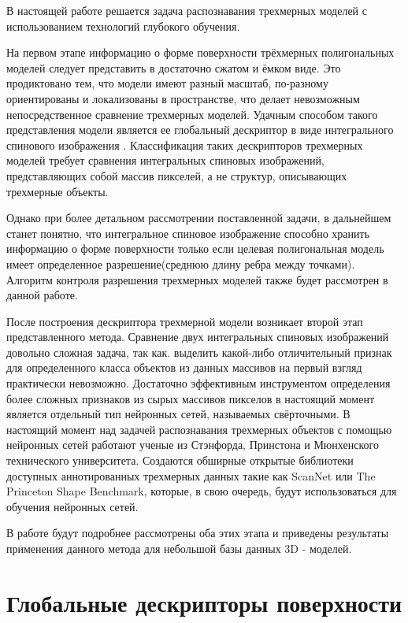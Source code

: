 \documentclass[14pt]{article}
\numberwithin{figure}{section}
\numberwithin{equation}{section}
\begin{document}
В настоящей работе решается задача распознавания трехмерных моделей с использованием технологий глубокого обучения.

На первом этапе информацию о форме поверхности трёхмерных полигональных моделей следует представить в достаточно сжатом и ёмком виде. Это продиктовано тем, что модели имеют разный масштаб, по-разному ориентированы и локализованы в пространстве, что делает невозможным непосредственное сравнение трехмерных моделей. Удачным способом такого представления модели является ее глобальный дескриптор в виде интегрального спинового изображения \cite{KCh}. Классификация таких дескрипторов трехмерных моделей требует сравнения интегральных спиновых изображений, представляющих собой массив пикселей, а не структур, описывающих трехмерные объекты.

Однако при более детальном рассмотрении поставленной задачи, в дальнейшем станет понятно, что интегральное спиновое изображение способно хранить информацию о форме поверхности только если целевая полигональная модель имеет определенное разрешение(среднюю длину ребра между точками). Алгоритм контроля разрешения трехмерных моделей также будет рассмотрен в данной работе.

После построения дескриптора трехмерной модели возникает второй этап представленного метода. Сравнение двух интегральных спиновых изображений довольно сложная задача, так как. выделить какой-либо отличительный признак для определенного класса объектов из данных массивов на первый взгляд практически невозможно. Достаточно эффективным инструментом определения более сложных признаков из сырых массивов пикселов в настоящий момент является отдельный тип нейронных сетей, называемых свёрточными. %
В настоящий момент над задачей распознавания трехмерных объектов с помощью нейронных сетей работают ученые из Стэнфорда, Принстона и Мюнхенского технического университета. Создаются обширные открытые библиотеки доступных аннотированных трехмерных данных такие как ScanNet или The Princeton Shape Benchmark\cite{PSB}, которые, в свою очередь, будут использоваться для обучения нейронных сетей.%

В работе будут подробнее рассмотрены оба этих этапа и приведены результаты применения данного метода для небольшой базы данных 3D - моделей.

\section{Глобальные дескрипторы поверхности}
\end{document}
